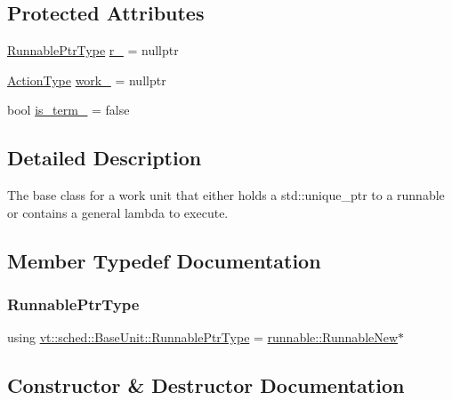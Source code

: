 \subsection*{Protected Attributes}
\begin{DoxyCompactItemize}
\item 
\hyperlink{structvt_1_1sched_1_1_base_unit_ab635b72e57c53fa666d30bbfe5a0df17}{Runnable\+Ptr\+Type} \hyperlink{structvt_1_1sched_1_1_base_unit_a0d126796f0ee5a8e0f3304e6ca02d0fc}{r\+\_\+} = nullptr
\item 
\hyperlink{namespacevt_ae0a5a7b18cc99d7b732cb4d44f46b0f3}{Action\+Type} \hyperlink{structvt_1_1sched_1_1_base_unit_ab425435c3b6c1cdf2fc208f1e50ea84c}{work\+\_\+} = nullptr
\item 
bool \hyperlink{structvt_1_1sched_1_1_base_unit_a5aab7332c91c6ccdc76bdb55de9cc502}{is\+\_\+term\+\_\+} = false
\end{DoxyCompactItemize}


\subsection{Detailed Description}
The base class for a work unit that either holds a {\ttfamily std\+::unique\+\_\+ptr} to a runnable or contains a general lambda to execute. 

\subsection{Member Typedef Documentation}
\mbox{\label{structvt_1_1sched_1_1_base_unit_ab635b72e57c53fa666d30bbfe5a0df17}} 
\subsubsection{\texorpdfstring{Runnable\+Ptr\+Type}{RunnablePtrType}}
{\footnotesize\ttfamily using \hyperlink{structvt_1_1sched_1_1_base_unit_ab635b72e57c53fa666d30bbfe5a0df17}{vt\+::sched\+::\+Base\+Unit\+::\+Runnable\+Ptr\+Type} =  \hyperlink{structvt_1_1runnable_1_1_runnable_new}{runnable\+::\+Runnable\+New}$\ast$}



\subsection{Constructor \& Destructor Documentation}
\mbox{\label{structvt_1_1sched_1_1_base_unit_a32cf291cd87b43dffa1f086d0ddb6c30}} 

